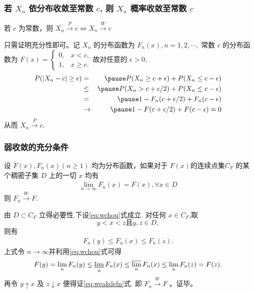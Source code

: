 \documentclass[Prob-All.tex]{subfiles}
\begin{document}
\begin{frame}
	\frametitle{若 $X_n$ 依分布收敛至常数 $c$, 则 $X_n$ 概率收敛至常数 $c$}
	\begin{thm}
		若 $c$ 为常数，则 $X_n\stackrel{P}{\rightarrow} c\Leftrightarrow X_n\stackrel{W}{\rightarrow} c$
	\end{thm}

	\pause 只需证明充分性即可。记 $X_n$ 的分布函数为 $F_n (x), n=1,2,\cdots, $ 常数 $c$ 的分布函数为 $F (x)=\left\{
	\begin{array}{ll}
		0, &x<c,\\
		1, &x\ge c.
	\end{array}\right.
	$\pause 故对任意的 $\epsilon>0$,
	\begin{eqnarray*}
		P(|X_n-c|\ge \epsilon)&=&\pause P(X_n\ge c+\epsilon)+P(X_n\le c-\epsilon)\\
		&\le&\pause  P(X_n> c+\epsilon/2)+P(X_n\le c-\epsilon)\\
		&=&\pause 1-F_n(c+\epsilon/2)+F_n(c-\epsilon)\\
		&\rightarrow& \pause 1-F(c+\epsilon/2)+F(c-\epsilon)=0
	\end{eqnarray*}
	\pause 从而 $X_n\stackrel{P}{\rightarrow} c$.
\end{frame}


\begin{frame}
	\frametitle{弱收敛的充分条件}
	\begin{thm}
		设 $F (x), F_n (x)(n\geq 1)$ 均为分布函数，如果对于 $F(x)$的连续点集$C_F$ 的某个稠密子集 $D$ 上的一切 $x$ 均有
		\begin{eqnarray}\label{eq:wchou}
			\lim_{n\rightarrow\infty}F_n(x)=F(x), \forall x\in D
		\end{eqnarray}
		则 $F_n\stackrel{W}\rightarrow F$.
	\end{thm}
\pause

\zheng 由 $D \subset C_{F}$ 立得必要性.下设\eqref{eq:wchou}式成立. 对任何 $x \in C_{F}$,取
$$y<x<z \text{且} y, z \in D,$$ 则有\pause
\begin{align}
	F_{n}(y) \leq F_{n}(x) \leq F_{n}(z).
\end{align}\pause
上式令 $n \rightarrow \infty$并利用\eqref{eq:wchou}式可得
\[
F(y)=\lim _{n} F_{n}(y) \leq \varliminf_{n} F_{n}(x) \leq \varlimsup_{n} F_{n}(x) \leq \lim _{n} F_{n}(z)=F(z) .
\]
\pause
再令 $y \uparrow x$ 及 $z \downarrow x$ 便得证\eqref{eq:weakdefn}式. 即 $F_{n} \xrightarrow{W} F$ 。证毕。


\end{frame}
\end{document}
